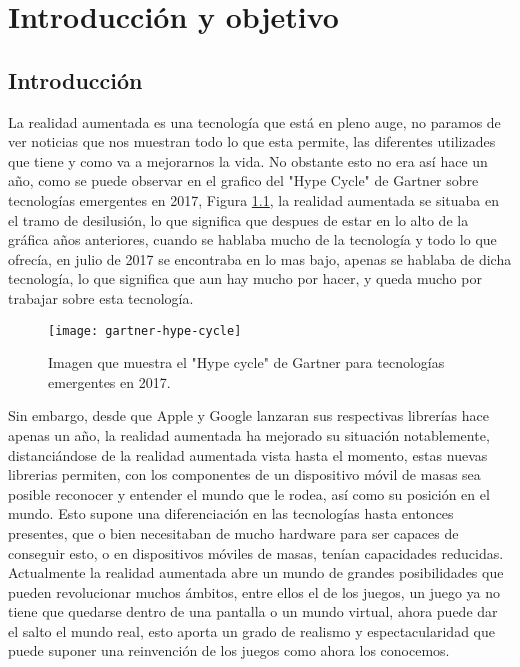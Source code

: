 \chapter{Introducción y objetivo}
\label{ch:introduccion}

\section{Introducción}
La realidad aumentada es una tecnología que está en pleno auge, no paramos de ver noticias que nos muestran todo lo que esta permite, las diferentes utilizades que tiene y como va a mejorarnos la vida. No obstante esto no era así hace un año, como se puede observar en el grafico del "Hype Cycle" de Gartner sobre tecnologías emergentes en 2017, Figura \ref{figura-gartner}, la realidad aumentada se situaba en el tramo de desilusión, lo que significa que despues de estar en lo alto de la gráfica años anteriores, cuando se hablaba mucho de la tecnología y todo lo que ofrecía, en julio de 2017 se encontraba en lo mas bajo, apenas se hablaba de dicha tecnología, lo que significa que aun hay mucho por hacer, y queda mucho por trabajar sobre esta tecnología.\\

\begin{figure}[h]
  \centering
  \texttt{[image: gartner-hype-cycle]}
  \caption{Imagen que muestra el "Hype cycle" de Gartner para tecnologías emergentes en 2017.\protect\footnotemark}
  \label{figura-gartner}
\end{figure}


Sin embargo, desde que Apple y Google lanzaran sus respectivas librerías hace apenas un año, la realidad aumentada ha mejorado su situación notablemente, distanciándose de la realidad aumentada vista hasta el momento, estas nuevas librerias permiten, con los componentes de un dispositivo móvil de masas sea posible reconocer y entender el mundo que le rodea, así como su posición en el mundo. Esto supone una diferenciación en las tecnologías hasta entonces presentes, que o bien necesitaban de mucho hardware para ser capaces de conseguir esto, o en dispositivos móviles de masas, tenían capacidades reducidas.\\

Actualmente la realidad aumentada abre un mundo de grandes posibilidades que pueden revolucionar muchos ámbitos, entre ellos el de los juegos, un juego ya no tiene que quedarse dentro de una pantalla o un mundo virtual, ahora puede dar el salto el mundo real, esto aporta un grado de realismo y espectacularidad que puede suponer una reinvención de los juegos como ahora los conocemos.\\

